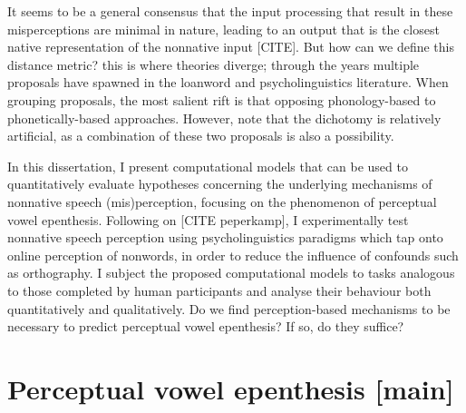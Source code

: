 It seems to be a general consensus %
that the input %
processing that result in these misperceptions are minimal in nature, leading to an output that is the closest native representation of the nonnative input [CITE]. But how can we define this distance metric? this is where theories diverge; through the years multiple proposals have spawned in the loanword and psycholinguistics literature. When grouping proposals, the most salient rift is that opposing phonology-based to phonetically-based approaches. %
However, note that the dichotomy is relatively artificial, as a combination of these two proposals is also a possibility. %

In this dissertation, I present computational models that can be used to quantitatively evaluate hypotheses concerning the underlying mechanisms of nonnative speech (mis)perception, focusing on the phenomenon of perceptual vowel epenthesis. Following on [CITE peperkamp], I experimentally test nonnative speech perception using psycholinguistics paradigms which tap onto online %
perception of nonwords, in order to reduce the influence of confounds such as orthography. %
I subject the proposed computational models to tasks analogous to those completed by human participants and analyse their behaviour both quantitatively and qualitatively. Do we find perception-based mechanisms to be necessary to predict perceptual vowel epenthesis? If so, do they suffice? 


\section{Perceptual vowel epenthesis [main]}

